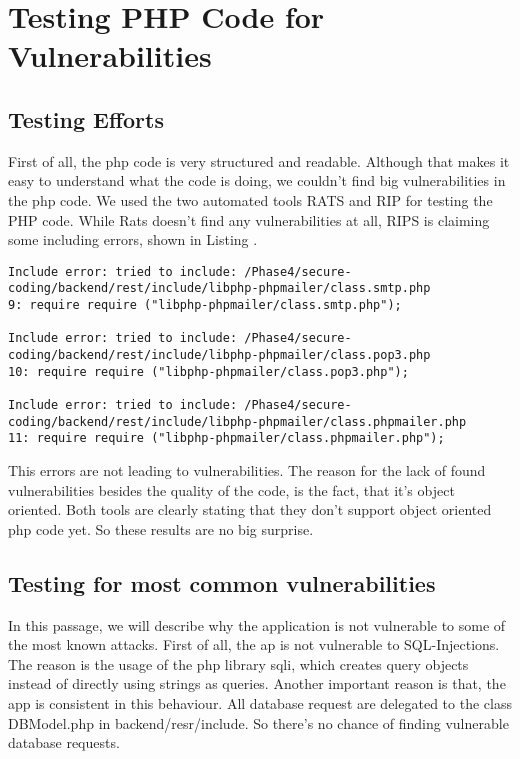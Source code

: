 \section{Testing PHP Code for Vulnerabilities}

\subsection{Testing Efforts}

First of all, the php code is very structured and readable. Although that makes it easy to understand what the code is doing, we couldn't find big vulnerabilities in the php code.
We used  the two automated tools RATS and RIP for testing the PHP code. While Rats doesn't find any vulnerabilities at all, RIPS is claiming some including errors, shown in Listing .
\begin{lstlisting}[caption= Output of automated testing tool RIPS]
Include error: tried to include: /Phase4/secure-coding/backend/rest/include/libphp-phpmailer/class.smtp.php
9: require require ("libphp-phpmailer/class.smtp.php"); 

Include error: tried to include: /Phase4/secure-coding/backend/rest/include/libphp-phpmailer/class.pop3.php
10: require require ("libphp-phpmailer/class.pop3.php"); 

Include error: tried to include: /Phase4/secure-coding/backend/rest/include/libphp-phpmailer/class.phpmailer.php
11: require require ("libphp-phpmailer/class.phpmailer.php"); 
\end{lstlisting}
This errors are not leading to vulnerabilities. The reason for the lack of found vulnerabilities besides the quality of the code, is the fact, that it's object oriented. Both tools are clearly stating that they don't support object oriented php code yet. So these results are no big surprise.

\subsection{Testing for most common vulnerabilities}
 In this passage, we will describe why the application is not vulnerable to some of the most known attacks.
 \newline
 First of all, the ap is not vulnerable to SQL-Injections. The reason is the usage of the php library sqli, which creates query objects instead of directly using strings as queries.
 Another important reason is that, the app is consistent in this behaviour. All database request are delegated to the class DBModel.php in backend/resr/include. So there's no chance of finding vulnerable database requests.
 \newline
 
 